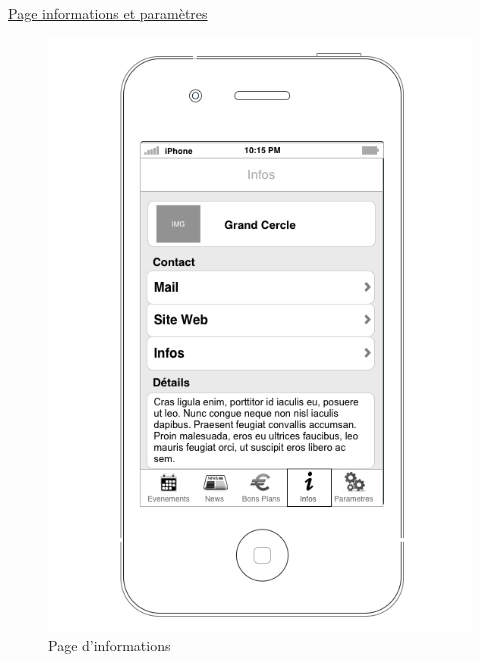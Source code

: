 \documentclass[a4paper, 11pt]{article}
\begin{document}
\underline{Page informations et paramètres}
\begin{figure}[h!]
	\begin{minipage}[c]{.33\linewidth}
		\begin{center}
			\includegraphics[scale=0.29]{../../Sketch/iOS/infos.png}
		\end{center}
	\caption{Page d'informations}
	\end{minipage}
	\begin{minipage}[c]{.33\linewidth}
		\begin{center}

\end{center}
\end{minipage}
\end{figure}
\end{document}
